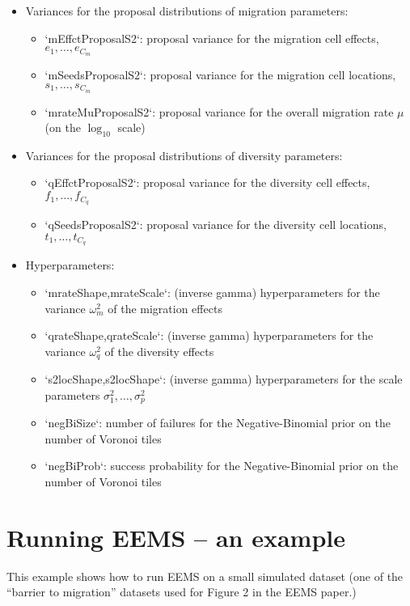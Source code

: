 \documentclass[a4paper,10pt,DIV=15,mpinclude=true]{scrartcl}
\begin{document}
\begin{itemize}
\item Variances for the proposal distributions of migration parameters:
\begin{itemize}
  \item `mEffctProposalS2`: proposal variance for the migration cell effects, $e_1,\ldots,e_{C_m}$
  \item `mSeedsProposalS2`: proposal variance for the migration cell locations, $s_1,\ldots,s_{C_m}$
  \item `mrateMuProposalS2`: proposal variance for the overall migration rate $\mu$ (on the $\log_{10}$ scale)
\end{itemize}
\item Variances for the proposal distributions of diversity parameters:
\begin{itemize}
  \item `qEffctProposalS2`: proposal variance for the diversity cell effects, $f_1,\ldots,f_{C_q}$
  \item `qSeedsProposalS2`: proposal variance for the diversity cell locations, $t_1,\ldots,t_{C_q}$
\end{itemize}
\item Hyperparameters:
\begin{itemize}
  \item `mrateShape,mrateScale`: (inverse gamma) hyperparameters for the variance $\omega_m^2$ of the migration effects
  \item `qrateShape,qrateScale`: (inverse gamma) hyperparameters for the variance $\omega_q^2$ of the diversity effects
  \item `s2locShape,s2locShape`: (inverse gamma) hyperparameters for the scale parameters $\sigma_1^2,\ldots,\sigma_p^2$
  \item `negBiSize`: number of failures for the Negative-Binomial prior on the number of Voronoi tiles
  \item `negBiProb`: success probability for the Negative-Binomial prior on the number of Voronoi tiles
\end{itemize}
\end{itemize}

\newpage
\section{Running EEMS -- an example}

This example shows how to run EEMS on a small simulated dataset (one of the ``barrier to migration'' datasets used for Figure 2 in the EEMS paper.)
\end{document}
